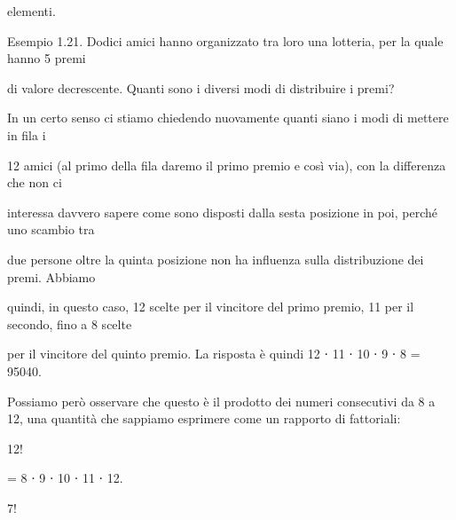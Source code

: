 \documentclass[a4paper,portrait,12pt]{article}
\begin{document}
\begin{flushleft}
elementi.
\end{flushleft}


\begin{flushleft}
Esempio 1.21. Dodici amici hanno organizzato tra loro una lotteria, per la quale hanno 5 premi
\end{flushleft}


\begin{flushleft}
di valore decrescente. Quanti sono i diversi modi di distribuire i premi?
\end{flushleft}


\begin{flushleft}
In un certo senso ci stiamo chiedendo nuovamente quanti siano i modi di mettere in fila i
\end{flushleft}


\begin{flushleft}
12 amici (al primo della fila daremo il primo premio e così via), con la differenza che non ci
\end{flushleft}


\begin{flushleft}
interessa davvero sapere come sono disposti dalla sesta posizione in poi, perch\'{e} uno scambio tra
\end{flushleft}


\begin{flushleft}
due persone oltre la quinta posizione non ha influenza sulla distribuzione dei premi. Abbiamo
\end{flushleft}


\begin{flushleft}
quindi, in questo caso, 12 scelte per il vincitore del primo premio, 11 per il secondo, fino a 8 scelte
\end{flushleft}


\begin{flushleft}
per il vincitore del quinto premio. La risposta \`{e} quindi 12 ⋅ 11 ⋅ 10 ⋅ 9 ⋅ 8 = 95040.
\end{flushleft}


\begin{flushleft}
Possiamo per\`{o} osservare che questo \`{e} il prodotto dei numeri consecutivi da 8 a 12, una quantit\`{a} che sappiamo esprimere come un rapporto di fattoriali:
\end{flushleft}


12!


= 8 ⋅ 9 ⋅ 10 ⋅ 11 ⋅ 12.


7!
\end{document}
